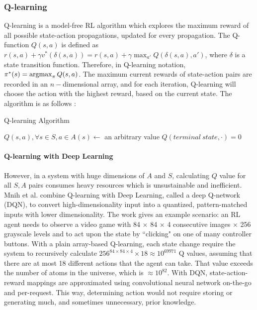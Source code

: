 \subsubsection{Q-learning}
\label{qlearning-dqn}
Q-learning is a model-free RL algorithm which explores the maximum reward of all possible state-action propagations, updated for every propagation. The Q-function $Q(s,a)$ is defined as $r(s,a)+\gamma{}v^*(\delta(s,a)) = r(s,a) + \gamma \max_{a'} Q(\delta(s,a),a')$, where $\delta$ is a state transition function. Therefore, in Q-learning notation, $\pi^*(s) = \operatorname*{argmax}_{\pi} Q(s,a)$. The maximum current rewards of state-action pairs are recorded in an $n-$dimensional array, and for each iteration, Q-learning will choose the action with the highest reward, based on the current state. The algorithm is as follows \cite{RL01}:

\begin{algorithm}
\caption{Q-learning Algorithm}
\label{alg-QL}
	$Q(s,a), \forall s \in S, a \in A(s) \gets$ an arbitrary value\;
	$Q(terminal\:state, \cdot) = 0$\;
\end{algorithm}

\paragraph{Q-learning with Deep Learning}
However, in a system with huge dimensions of $A$ and $S$, calculating $Q$ value for all $S,A$ pairs consumes heavy resources which is unsustainable and inefficient. Mnih et al. \cite{RL03} combine Q-learning with Deep Learning, called a deep Q-network (DQN), to convert high-dimensionality input into a quantized, pattern-matched inputs with lower dimensionality. The work gives an example scenario: an RL agent needs to observe a video game with 84 $\times$ 84 $\times$ 4 consecutive images $\times$ 256 grayscale levels and to act upon the state by ``clicking" on one of many controller buttons. With a plain array-based Q-learning, each state change require the system to recursively calculate $256^{84 \times 84 \times 4} \times 18 \approx 10^{69971}$ Q values, assuming that there are at most 18 different actions that the agent can take. That value exceeds the number of atoms in the universe, which is $\approx 10^{82}$. With DQN, state-action-reward mappings are approximated using convolutional neural network on-the-go and per-request. This way, determining action would not require storing or generating much, and sometimes unnecessary, prior knowledge.

